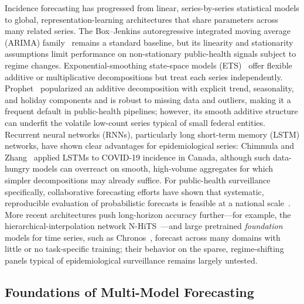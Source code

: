 \documentclass[runningheads]{llncs}
\begin{document}
Incidence forecasting has progressed from linear, series-by-series
statistical models to global, representation-learning architectures
that share parameters across many related series. The Box--Jenkins
autoregressive integrated moving average (ARIMA) family~\cite{box2015}
remains a
standard baseline, but its linearity and stationarity assumptions
limit performance on non-stationary public-health signals subject to
regime changes. Exponential-smoothing state-space models
(ETS)~\cite{hyndman2018forecasting,hyndman2008} offer flexible additive or
multiplicative decompositions but treat each series independently.
Prophet~\cite{taylor2018} popularized an additive decomposition with
explicit trend, seasonality, and holiday components and is robust to
missing data and outliers, making it a frequent default in
public-health pipelines; however, its smooth additive structure can
underfit the volatile low-count series typical of small federal
entities. Recurrent neural networks (RNNs), particularly long
short-term memory (LSTM) networks, have shown clear
advantages for epidemiological series: Chimmula and
Zhang~\cite{chimmula2020} applied LSTMs to COVID-19 incidence in
Canada, although such data-hungry models can overreact on smooth,
high-volume aggregates for which simpler decompositions may already
suffice. For
public-health surveillance specifically, collaborative forecasting
efforts have shown that systematic, reproducible evaluation of
probabilistic forecasts is feasible at a national
scale~\cite{cramer2022,reich2019}. More recent architectures push long-horizon
accuracy further---for example, the hierarchical-interpolation network
N-HiTS~\cite{challu2023nhits}---and large pretrained \emph{foundation}
models for time series, such as Chronos~\cite{ansari2024chronos},
forecast across many domains with little or no task-specific training;
their behavior on the sparse, regime-shifting panels typical of
epidemiological surveillance remains largely untested.

\subsection{Foundations of Multi-Model Forecasting}
\label{ssec:multimodel}
\end{document}
